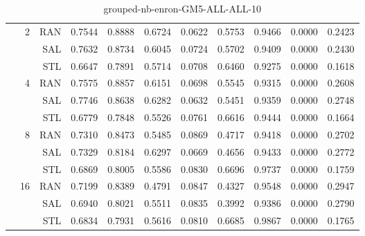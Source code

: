 \begin{center}
\begin{table}[htbp]
\begin{center}
\begin{tabular}{ | r | r | r | r | r | r | r | r | r | r | r |}
 & \multirow{3}{*}{2} & RAN & 0.7544 & 0.8888 & 0.6724 & 0.0622 & 0.5753 & 0.9466 & 0.0000 & 0.2423\\ \cline{3-11}
 &   & SAL & 0.7632 & 0.8734 & 0.6045 & 0.0724 & 0.5702 & 0.9409 & 0.0000 & 0.2430\\ \cline{3-11}
 &   & STL & 0.6647 & 0.7891 & 0.5714 & 0.0708 & 0.6460 & 0.9275 & 0.0000 & 0.1618\\ \cline{2-11}
 & \multirow{3}{*}{4} & RAN & 0.7575 & 0.8857 & 0.6151 & 0.0698 & 0.5545 & 0.9315 & 0.0000 & 0.2608\\ \cline{3-11}
 &   & SAL & 0.7746 & 0.8638 & 0.6282 & 0.0632 & 0.5451 & 0.9359 & 0.0000 & 0.2748\\ \cline{3-11}
 &   & STL & 0.6779 & 0.7848 & 0.5526 & 0.0761 & 0.6616 & 0.9444 & 0.0000 & 0.1664\\ \cline{2-11}
 & \multirow{3}{*}{8} & RAN & 0.7310 & 0.8473 & 0.5485 & 0.0869 & 0.4717 & 0.9418 & 0.0000 & 0.2702\\ \cline{3-11}
 &   & SAL & 0.7329 & 0.8184 & 0.6297 & 0.0669 & 0.4656 & 0.9433 & 0.0000 & 0.2772\\ \cline{3-11}
 &   & STL & 0.6869 & 0.8005 & 0.5586 & 0.0830 & 0.6696 & 0.9737 & 0.0000 & 0.1759\\ \cline{2-11}
 & \multirow{3}{*}{16} & RAN & 0.7199 & 0.8389 & 0.4791 & 0.0847 & 0.4327 & 0.9548 & 0.0000 & 0.2947\\ \cline{3-11}
 &   & SAL & 0.6940 & 0.8021 & 0.5511 & 0.0835 & 0.3992 & 0.9386 & 0.0000 & 0.2790\\ \cline{3-11}
 &   & STL & 0.6834 & 0.7931 & 0.5616 & 0.0810 & 0.6685 & 0.9867 & 0.0000 & 0.1765\\ \cline{2-11}
\hline
\end{tabular}
\caption{grouped-nb-enron-GM5-ALL-ALL-10}
\end{center}
 \end{table}
\end{center}

